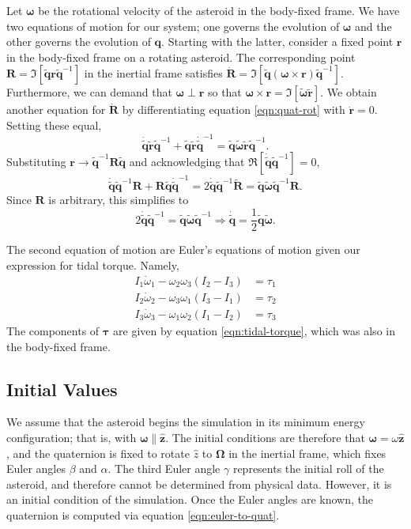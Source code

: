 \documentclass{aastex631}
\newcommand{\unit}[1]{\hat{\bm{#1}}}
\newcommand{\quat}[1]{\widetilde{\bm{#1}}}
\begin{document}
Let $\bm\omega$ be the rotational velocity of the asteroid in the body-fixed frame. We have two equations of motion for our system; one governs the evolution of $\bm \omega$ and the other governs the evolution of $\bm q$. Starting with the latter, consider a fixed point $\bm r$ in the body-fixed frame on a rotating asteroid. The corresponding point $\bm R=\Im[\quat q \bm r \quat q^{-1}]$ in the inertial frame satisfies $\dot{\bm R} = \Im[\quat q(\bm \omega \times \bm r )\quat q^{-1}]$. Furthermore, we can demand that $\bm \omega \perp \bm r$ so that $\bm \omega \times \bm r = \Im[\quat \omega \quat r]$. We obtain another equation for $\dot{\bm R}$ by differentiating equation \ref{eqn:quat-rot} with $\dot{\bm r} = 0$. Setting these equal,
\begin{equation}
\dot{\quat q} \quat r \quat q^{-1} + \quat q \quat r \dot{\quat q}^{-1} = \quat q\quat \omega \quat r \quat q^{-1}.
\nonumber
\end{equation}
Substituting $\bm r \rightarrow \quat q^{-1}\bm R \quat q$ and acknowledging that $\Re[\dot{\quat q} \quat q^{-1}] = 0$,
\begin{equation}
  \dot{\quat q} \quat q^{-1}\bm R + \bm R \quat q \dot{\quat q}^{-1} = 2\dot{\quat q}\quat q^{-1}\quat R = \quat q\quat \omega \quat q^{-1}\bm R.
\nonumber
\end{equation}
Since $\bm R$ is arbitrary, this simplifies to
\begin{equation}
  2\dot{\quat q}\quat q^{-1} =  \quat q\quat \omega \quat q^{-1} \Rightarrow \dot{\quat q} = \frac{1}{2}\quat q\quat \omega.
\label{eqn:quat-eom}
\end{equation}

The second equation of motion are Euler's equations of motion given our expression for tidal torque. Namely,
\begin{eqnarray}
I_1 \dot \omega_1 - \omega_2 \omega_3 (I_2 - I_3) &= \tau_1\\
I_2 \dot \omega_2 - \omega_3 \omega_1 (I_3 - I_1) &= \tau_2\\
I_3 \dot \omega_3 - \omega_1 \omega_2 (I_1 - I_2) &= \tau_3
\label{eqn:omega-eom}
\end{eqnarray}
The components of $\bm \tau$ are given by equation \ref{eqn:tidal-torque}, which was also in the body-fixed frame.


\subsection{Initial Values}
We assume that the asteroid begins the simulation in its minimum energy configuration; that is, with $\bm \omega \parallel \unit z$. The initial conditions are therefore that $\bm \omega = \omega \unit z$, and the quaternion is fixed to rotate $\hat z$ to $\bm \Omega$ in the inertial frame, which fixes Euler angles $\beta$ and $\alpha$. The third Euler angle $\gamma$ represents the initial roll of the asteroid, and therefore cannot be determined from physical data. However, it is an initial condition of the simulation. Once the Euler angles are known, the quaternion is computed via equation \ref{eqn:euler-to-quat}.
\end{document}
